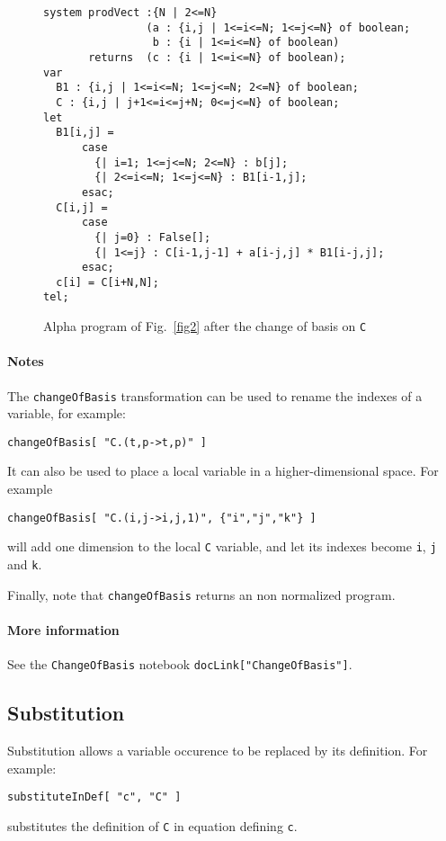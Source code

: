 \documentclass[12pt]{article}
\newcommand{\Alpha}{{\sc Alpha}}
\begin{document}
\begin{figure}[ht]
\begin{verbatim}
system prodVect :{N | 2<=N}
                (a : {i,j | 1<=i<=N; 1<=j<=N} of boolean; 
                 b : {i | 1<=i<=N} of boolean)
       returns  (c : {i | 1<=i<=N} of boolean);
var
  B1 : {i,j | 1<=i<=N; 1<=j<=N; 2<=N} of boolean;
  C : {i,j | j+1<=i<=j+N; 0<=j<=N} of boolean;
let
  B1[i,j] = 
      case
        {| i=1; 1<=j<=N; 2<=N} : b[j];
        {| 2<=i<=N; 1<=j<=N} : B1[i-1,j];
      esac;
  C[i,j] = 
      case
        {| j=0} : False[];
        {| 1<=j} : C[i-1,j-1] + a[i-j,j] * B1[i-j,j];
      esac;
  c[i] = C[i+N,N];
tel;
\end{verbatim}
\caption{{\Alpha} program of Fig.~\ref{fig2} after the change of basis on 
 {\tt C}}
\label{fig3}
\end{figure}

\paragraph*{Notes}
The \texttt{changeOfBasis} transformation can be used to rename 
the indexes of a variable, for example:
\begin{verbatim}
changeOfBasis[ "C.(t,p->t,p)" ]
\end{verbatim}

It can also be used to place a local variable in a higher-dimensional
space. For example
\begin{verbatim}
changeOfBasis[ "C.(i,j->i,j,1)", {"i","j","k"} ]
\end{verbatim}
will add one dimension to the local \texttt{C} variable, and 
let its indexes become \texttt{i}, \texttt{j} and \texttt{k}.

Finally, note that \texttt{changeOfBasis} returns an non 
normalized program. 

\paragraph*{More information}
See the \texttt{ChangeOfBasis} notebook
\texttt{docLink["ChangeOfBasis"]}.

\subsection{Substitution}
Substitution allows a variable occurence 
to be replaced by its definition. For example:
\begin{verbatim}
substituteInDef[ "c", "C" ]
\end{verbatim}
substitutes the definition of \texttt{C} in equation defining
\texttt{c}. 
\end{document}
